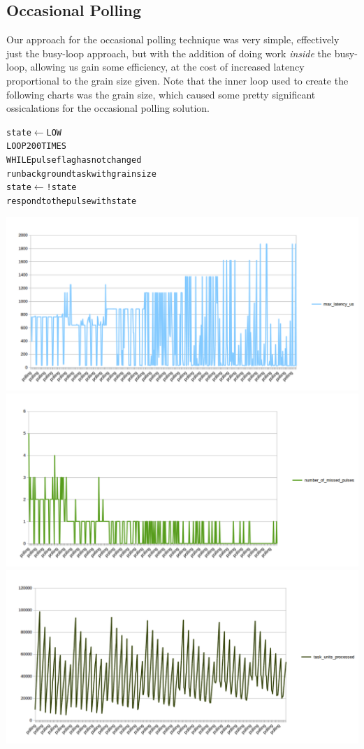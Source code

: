 \documentclass[12pt]{article}
\begin{document}
\subsection{Occasional Polling}
Our approach for the occasional polling technique was very simple, effectively
just the busy-loop approach, but with the addition of doing work \emph{inside}
the busy-loop, allowing us gain some efficiency, at the cost of increased
latency proportional to the grain size given. Note that the inner loop used
to create the following charts was the grain size, which caused some pretty
significant ossicalations for the occasional polling solution.

\begin{alltt}
state \(\gets\) LOW
LOOP 200 TIMES
    WHILE pulse flag has not changed
        run background task with grain size
    state \(\gets\) !state
    respond to the pulse with state
\end{alltt}
\includegraphics[width=\textwidth]{polling_max_latency.png}
\includegraphics[width=\textwidth]{polling_missed_pulses.png}
\includegraphics[width=\textwidth]{polling_units_processed.png}
\end{document}

